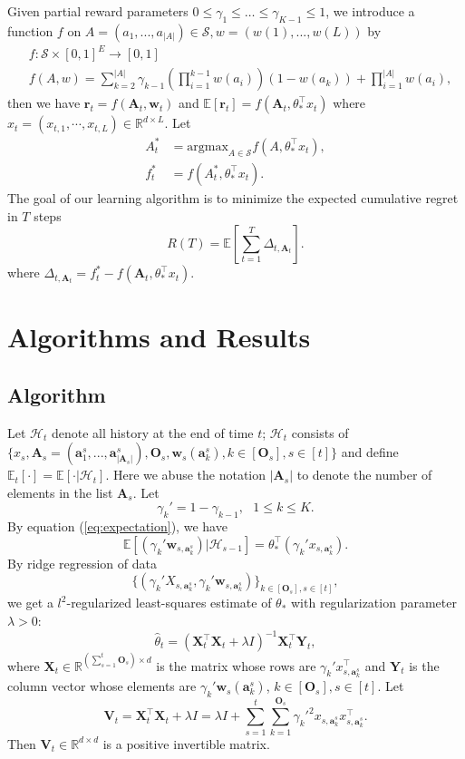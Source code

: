 \documentclass{article}
\newcommand{\EE}{\mathbb{E}}
\newcommand{\RR}{\mathbb{R}}
\newcommand{\bA}{\mathbf{A}}
\newcommand{\ba}{\mathbf{a}}
\newcommand{\bO}{\mathbf{O}}
\newcommand{\br}{\mathbf{r}}
\newcommand{\bV}{\mathbf{V}}
\newcommand{\bw}{\mathbf{w}}
\newcommand{\bX}{\mathbf{X}}
\newcommand{\bY}{\mathbf{Y}}
\newcommand{\cH}{\mathcal{H}}
\newcommand{\cS}{\mathcal{S}}
\newcommand{\argmax}{\mathrm{argmax}}
\newcommand{\abs}[1]{\left| #1 \right|}
\begin{document}
Given partial reward parameters $0 \leq \gamma_1 \leq \ldots \leq \gamma_{K-1} \leq 1$, we introduce a function $f$ on $A=(a_1,...,a_{\abs{A}}) \in \cS, w=(w(1),...,w(L))$ by
\begin{align*}
&f : \cS \times [0,1]^E \to [0,1]\\
&f(A,w) = \sum_{k=2}^{\abs{A}}\gamma_{k-1} (\prod_{i=1}^{k-1}w(a_i))(1 - w(a_k)) + \prod_{i=1}^{\abs{A}}w(a_i),
\end{align*}
then we have $\br_t = f(\bA_t, \bw_t)$ and $\EE[\br_t]=f(\bA_t,\theta_*^{\top}x_t)$ where $x_t=(x_{t,1}, \cdots, x_{t,L}) \in \RR^{d \times L}$. Let 
\begin{align*}
A_t^* &= \argmax_{A\in \cS} f(A,\theta_*^{\top}x_t),\\
f_t^* &= f(A_t^*, \theta_*^{\top}x_t).
\end{align*}
The goal of our learning algorithm is to minimize the expected cumulative regret in $T$ steps
$$
R(T) = \EE[\sum_{t=1}^T \Delta_{t,\bA_t}].
$$
where $\Delta_{t,\bA_t} = f_t^* - f(\bA_t, \theta_*^{\top}x_t)$.



\section{Algorithms and Results}

\subsection{Algorithm}
	
Let $\cH_t$ denote all history at the end of time $t$; $\cH_t$ consists of $\{x_s, \bA_s=(\ba_{1}^s,...,\ba_{\abs{\bA_s}}^s), \bO_s, \bw_s(\ba_k^s), k \in[\bO_s], s\in[t] \}$ and define $\EE_t[\cdot] = \EE[\cdot | \cH_t]$. Here we abuse the notation $\abs{\bA_s}$ to denote the number of elements in the list $\bA_s$. Let
$$
\gamma_k' = 1 - \gamma_{k-1}, ~~~1 \leq k \leq K.
$$
By equation (\ref{eq:expectation}), we have 
$$
\EE[(\gamma_k'\bw_{s,\ba_k^s}) | \cH_{s-1}] = \theta_*^{\top} (\gamma_k' x_{s,\ba_k^s}).
$$
By ridge regression of data 
$$
\{(\gamma_k' X_{s,\ba_k^s}, \gamma_k'\bw_{s,\ba_k^s})\}_{k \in[\bO_s], s\in[t]},
$$
we get a $l^2$-regularized least-squares estimate of $\theta_*$ with regularization parameter $\lambda > 0$:
\begin{equation}
\hat{\theta}_t = (\bX_t^{\top}\bX_t + \lambda I)^{-1} \bX_t^{\top} \bY_t,
\end{equation}
where $\bX_t \in \RR^{(\sum_{s=1}^{t}\bO_s) \times d}$ is the matrix whose rows are $\gamma_k' x_{s,\ba_k^s}^{\top}$ and $\bY_t$ is the column vector whose elements are $\gamma_k' \bw_s(\ba_k^s)$, $k \in[\bO_s], s\in[t]$. Let
$$
\bV_t = \bX_t^{\top} \bX_t + \lambda I = \lambda I + \sum_{s=1}^{t} \sum_{k=1}^{\bO_s} \gamma_k'^2 x_{s,\ba_k^s}x_{s,\ba_k^s}^{\top}.
$$
Then $\bV_t \in \RR^{d \times d}$ is a positive invertible matrix.
\end{document}
